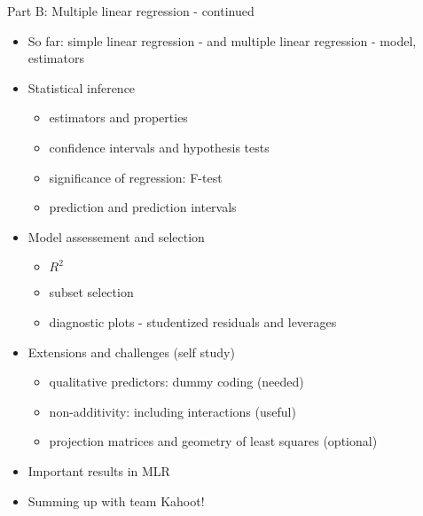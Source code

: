 \documentclass[ignorenonframetext,]{beamer}
\providecommand{\tightlist}{%
  \setlength{\itemsep}{0pt}\setlength{\parskip}{0pt}}
\begin{document}
\begin{frame}

\begin{block}{Part B: Multiple linear regression - continued}

\begin{itemize}
\tightlist
\item
  So far: simple linear regression - and multiple linear regression -
  model, estimators
\item
  Statistical inference

  \begin{itemize}
  \tightlist
  \item
    estimators and properties
  \item
    confidence intervals and hypothesis tests
  \item
    significance of regression: F-test
  \item
    prediction and prediction intervals
  \end{itemize}
\item
  Model assessement and selection

  \begin{itemize}
  \tightlist
  \item
    \(R^2\)
  \item
    subset selection
  \item
    diagnostic plots - studentized residuals and leverages
  \end{itemize}
\end{itemize}

\end{block}

\end{frame}

\begin{frame}

\begin{itemize}
\tightlist
\item
  Extensions and challenges (self study)

  \begin{itemize}
  \tightlist
  \item
    qualitative predictors: dummy coding (needed)
  \item
    non-additivity: including interactions (useful)
  \item
    projection matrices and geometry of least squares (optional)
  \end{itemize}
\item
  Important results in MLR
\item
  Summing up with team Kahoot!
\end{itemize}

\end{frame}
\end{document}
